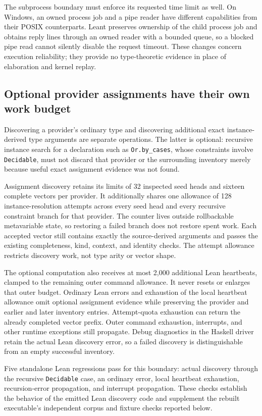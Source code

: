 \documentclass[11pt]{article}
\newcommand{\code}[1]{\texttt{#1}}
\begin{document}
The subprocess boundary must enforce its requested time limit as well. On
Windows, an owned process job and a pipe reader have different capabilities
from their POSIX counterparts. Leant preserves ownership of the child process
job and obtains reply lines through an owned reader with a bounded queue, so a
blocked pipe read cannot silently disable the request timeout. These changes
concern execution reliability; they provide no type-theoretic evidence in
place of elaboration and kernel replay.

\subsection{Optional provider assignments have their own work budget}

Discovering a provider's ordinary type and discovering additional exact
instance-derived type arguments are separate operations. The latter is
optional: recursive instance search for a declaration such as
\code{Or.by\_cases}, whose constraints involve \code{Decidable}, must not
discard that provider or the surrounding inventory merely because useful
exact assignment evidence was not found.

Assignment discovery retains its limits of 32 inspected seed heads and sixteen
complete vectors per provider. It additionally shares one allowance of 128
instance-resolution attempts across every seed head and every recursive
constraint branch for that provider. The counter lives outside rollbackable
metavariable state, so restoring a failed branch does not restore spent work.
Each accepted vector still contains exactly the source-derived arguments and
passes the existing completeness, kind, context, and identity checks. The
attempt allowance restricts discovery work, not type arity or vector shape.

The optional computation also receives at most 2,000 additional Lean
heartbeats, clamped to the remaining outer command allowance. It never resets
or enlarges that outer budget. Ordinary Lean errors and exhaustion of the
local heartbeat allowance omit optional assignment evidence while preserving
the provider and earlier and later inventory entries. Attempt-quota exhaustion
can return the already completed vector prefix. Outer command exhaustion,
interrupts, and other runtime exceptions still propagate. Debug diagnostics in
the Haskell driver retain the actual Lean discovery error, so a failed
discovery is distinguishable from an empty successful inventory.

Five standalone Lean regressions pass for this boundary: actual discovery
through the recursive \code{Decidable} case, an ordinary error, local
heartbeat exhaustion, recursion-error propagation, and interrupt propagation.
These checks establish the behavior of the emitted Lean discovery code and
supplement the rebuilt executable's independent corpus and fixture checks
reported below.
\end{document}
